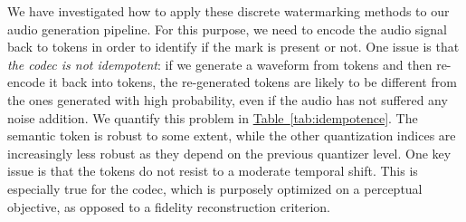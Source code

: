 We have investigated how to apply these discrete watermarking methods to our audio generation pipeline. For this purpose, we need to encode the audio signal back to tokens in order to identify if the mark is present or not. One issue is that \emph{the codec is not idempotent}: if we generate a waveform from tokens and then re-encode it back into tokens, the re-generated tokens are likely to be different from the ones generated with high probability, even if the audio has not suffered any noise addition. We quantify this problem in \hyperref[tab:idempotence]{Table~\ref{tab:idempotence}}. The semantic token is robust to some extent, while the other quantization indices are increasingly less robust as they depend on the previous quantizer level. One key issue is that the tokens do not resist to a moderate temporal shift. This is especially true for the \mimi codec, which is purposely optimized on a perceptual objective, as opposed to a fidelity reconstruction criterion. 


